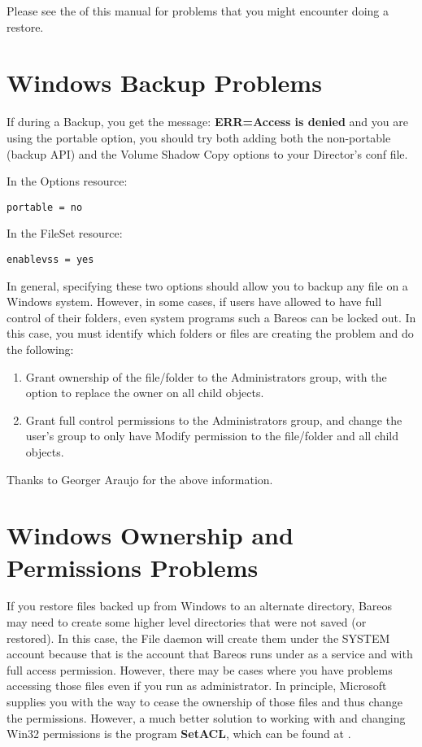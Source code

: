 Please see the
 of this manual for problems
that you might encounter doing a restore.

\section{Windows Backup Problems}

If during a Backup, you get the message:
{\bf ERR=Access is denied} and you are using the portable option,
you should try both adding both the non-portable (backup API) and
the Volume Shadow Copy options to your Director's conf file.

In the Options resource:
\footnotesize
\begin{verbatim}
portable = no
\end{verbatim}
\normalsize

In the FileSet resource:
\footnotesize
\begin{verbatim}
enablevss = yes
\end{verbatim}
\normalsize

In general, specifying these two options should allow you to backup
any file on a Windows system.  However, in some cases, if users
have allowed to have full control of their folders, even system programs
such a Bareos can be locked out.  In this case, you must identify
which folders or files are creating the problem and do the following:

\begin{enumerate}
\item Grant ownership of the file/folder to the Administrators group,
with the option to replace the owner on all child objects.
\item Grant full control permissions to the Administrators group,
and change the user's group to only have Modify permission to
the file/folder and all child objects.
\end{enumerate}

Thanks to Georger Araujo for the above information.

\section{Windows Ownership and Permissions Problems}

If you restore files backed up from Windows to an alternate directory,
Bareos may need to create some higher level directories that were not saved
(or restored). In this case, the File daemon will create them under the SYSTEM
account because that is the account that Bareos runs under as a service and with full access permission.
However, there may be cases where you have problems accessing those files even
if you run as administrator. In principle, Microsoft supplies you with the way
to cease the ownership of those files and thus change the permissions.
However, a much better solution to working with and changing Win32 permissions
is the program {\bf SetACL}, which can be found at
.


